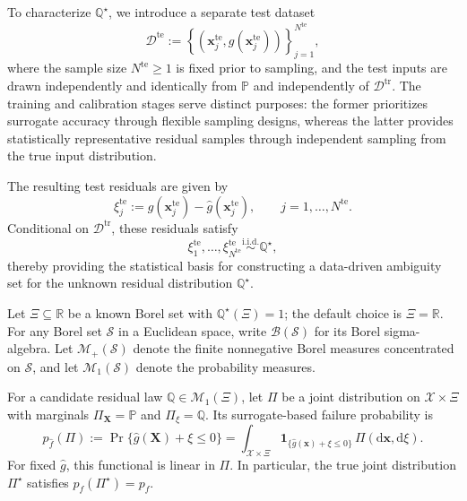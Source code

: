 \documentclass[review,11pt,3p,authoryear,nopreprintline]{elsarticle}
\begin{document}
To characterize $\mathbb Q^\star$, we introduce a separate test dataset
\[
  \mathcal D^{\mathrm{te}}:=\left\{\left(\bm x_j^{\mathrm{te}},g(\bm x_j^{\mathrm{te}})\right)\right\}_{j=1}^{N^{\mathrm{te}}},
\]
where the sample size $N^{\mathrm{te}}\ge1$ is fixed prior to sampling, and the test inputs are drawn independently and identically from $\mathbb P$ and independently of $\mathcal D^{\mathrm{tr}}$. The training and calibration stages serve distinct purposes: the former prioritizes surrogate accuracy through flexible sampling designs, whereas the latter provides statistically representative residual samples through independent sampling from the true input distribution.

The resulting test residuals are given by
\[
  \xi_j^{\mathrm{te}}:=g(\bm x_j^{\mathrm{te}})-\hat g(\bm x_j^{\mathrm{te}}),\qquad j=1,\ldots,N^{\mathrm{te}}.
\]
Conditional on $\mathcal D^{\mathrm{tr}}$, these residuals satisfy
\[
  \xi_1^{\mathrm{te}},\ldots,\xi_{N^{\mathrm{te}}}^{\mathrm{te}}\overset{\mathrm{i.i.d.}}{\sim}\mathbb Q^\star,
\]
thereby providing the statistical basis for constructing a data-driven ambiguity set for the unknown residual distribution $\mathbb Q^\star$.

Let $\Xi\subseteq\mathbb R$ be a known Borel set with $\mathbb Q^\star(\Xi)=1$; the default choice is $\Xi=\mathbb R$. For any Borel set $\mathcal S$ in a Euclidean space, write $\mathcal B(\mathcal S)$ for its Borel sigma-algebra. Let $\mathcal M_+(\mathcal S)$ denote the finite nonnegative Borel measures concentrated on $\mathcal S$, and let $\mathcal M_1(\mathcal S)$ denote the probability measures.

For a candidate residual law $\mathbb Q\in\mathcal M_1(\Xi)$, let $\Pi$ be a joint distribution on $\mathcal X\times\Xi$ with marginals $\Pi_{\bm X}=\mathbb P$ and $\Pi_\xi=\mathbb Q$. Its surrogate-based failure probability is
\begin{equation}
  p_{\hat f}(\Pi):=\Pr\{\hat g(\bm X)+\xi\le0\}=\int_{\mathcal X\times\Xi}\mathbf 1_{\{\hat g(\bm x)+\xi\le0\}}\,\Pi(\mathrm d\bm x,\mathrm d\xi).
  \label{eq-surrogate-failure-probability}
\end{equation}
For fixed $\hat g$, this functional is linear in $\Pi$. In particular, the true joint distribution $\Pi^\star$ satisfies $p_{\hat f}(\Pi^\star)=p_f$.
\end{document}
